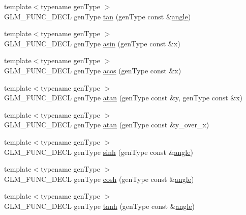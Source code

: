 \begin{DoxyCompactItemize}
\item 
{\footnotesize template$<$typename gen\-Type $>$ }\\G\-L\-M\-\_\-\-F\-U\-N\-C\-\_\-\-D\-E\-C\-L gen\-Type \hyperlink{group__core__func__trigonometric_ga328aeb0de4f312dc3d200cb929715d44}{tan} (gen\-Type const \&\hyperlink{group__gtc__quaternion_ga23a3fc7ada5bbb665ff84c92c6e0542c}{angle})
\item 
{\footnotesize template$<$typename gen\-Type $>$ }\\G\-L\-M\-\_\-\-F\-U\-N\-C\-\_\-\-D\-E\-C\-L gen\-Type \hyperlink{group__core__func__trigonometric_gafca5e8c71ea06be0840227b4aafc5680}{asin} (gen\-Type const \&x)
\item 
{\footnotesize template$<$typename gen\-Type $>$ }\\G\-L\-M\-\_\-\-F\-U\-N\-C\-\_\-\-D\-E\-C\-L gen\-Type \hyperlink{group__core__func__trigonometric_gac85497ed2e39d4cac4ac32bed4dfc506}{acos} (gen\-Type const \&x)
\item 
{\footnotesize template$<$typename gen\-Type $>$ }\\G\-L\-M\-\_\-\-F\-U\-N\-C\-\_\-\-D\-E\-C\-L gen\-Type \hyperlink{group__core__func__trigonometric_gabf80ac0817d1db032dd6a0969aa2b84a}{atan} (gen\-Type const \&y, gen\-Type const \&x)
\item 
{\footnotesize template$<$typename gen\-Type $>$ }\\G\-L\-M\-\_\-\-F\-U\-N\-C\-\_\-\-D\-E\-C\-L gen\-Type \hyperlink{group__core__func__trigonometric_gaa7be96f0c12a40eeac5c7f04a3d465a1}{atan} (gen\-Type const \&y\-\_\-over\-\_\-x)
\item 
{\footnotesize template$<$typename gen\-Type $>$ }\\G\-L\-M\-\_\-\-F\-U\-N\-C\-\_\-\-D\-E\-C\-L gen\-Type \hyperlink{group__core__func__trigonometric_ga2e8c9a896e803661058de83429aa6eda}{sinh} (gen\-Type const \&\hyperlink{group__gtc__quaternion_ga23a3fc7ada5bbb665ff84c92c6e0542c}{angle})
\item 
{\footnotesize template$<$typename gen\-Type $>$ }\\G\-L\-M\-\_\-\-F\-U\-N\-C\-\_\-\-D\-E\-C\-L gen\-Type \hyperlink{group__core__func__trigonometric_gaa7685634f6e920ba9a683e5ec7aed976}{cosh} (gen\-Type const \&\hyperlink{group__gtc__quaternion_ga23a3fc7ada5bbb665ff84c92c6e0542c}{angle})
\item 
{\footnotesize template$<$typename gen\-Type $>$ }\\G\-L\-M\-\_\-\-F\-U\-N\-C\-\_\-\-D\-E\-C\-L gen\-Type \hyperlink{group__core__func__trigonometric_ga941f20e5315113d1a2e037f073a62f04}{tanh} (gen\-Type const \&\hyperlink{group__gtc__quaternion_ga23a3fc7ada5bbb665ff84c92c6e0542c}{angle})

\end{DoxyCompactItemize}
